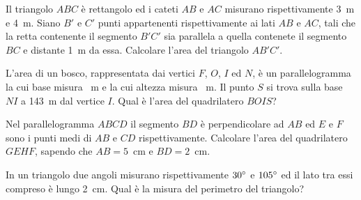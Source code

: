 \begin{multicols}{2}
	\centering

\begin{esercizio}
\label{ese:7.107}
Il triangolo $ABC$ è rettangolo ed i cateti $AB$ e $AC$ misurano rispettivamente 3~m e 4~m. Siano $B'$ e $C'$ punti appartenenti rispettivamente ai lati $AB$ e $AC$, tali che la retta contenente il segmento $B'C'$ sia parallela a quella contenete il segmento $BC$ e distante 1~m da essa. Calcolare l'area del triangolo $AB'C'$.
\end{esercizio}

	\centering

\begin{esercizio}
\label{ese:7.108}
L'area di un bosco, rappresentata dai vertici $F$, $O$, $I$ ed $N$, è un parallelogramma la cui base misura ~m e la cui altezza misura ~m. Il punto $S$ si trova sulla base $NI$ a 143~m dal vertice $I$. Qual è l'area del quadrilatero $BOIS$?
\end{esercizio}

	\centering

\begin{esercizio}
\label{ese:7.109}
Nel parallelogramma $ABCD$ il segmento $BD$ è perpendicolare ad $AB$ ed $E$ e $F$ sono i punti medi di $AB$ e $CD$ rispettivamente. Calcolare l'area del quadrilatero $GEHF$, sapendo che $AB=5$~cm e $BD=2$~cm.
\end{esercizio}

	\centering

\begin{esercizio}
\label{ese:7.110}
In un triangolo due angoli misurano rispettivamente $30{}^{\circ}$ e $105{}^{\circ}$ ed il lato tra essi compreso è lungo 2~cm. Qual è la misura del perimetro del triangolo? 
\end{esercizio}


\end{multicols}
